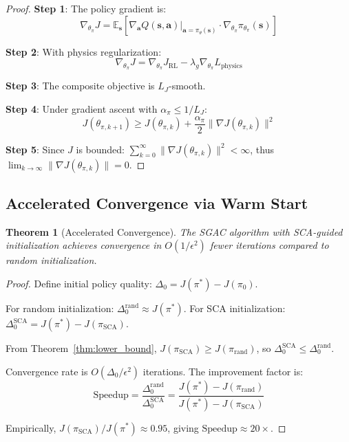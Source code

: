 \documentclass[11pt,a4paper]{article}
\newtheorem{theorem}{Theorem}[section]
\newcommand{\E}{\mathbb{E}}
\newcommand{\bs}{\mathbf{s}}
\newcommand{\ba}{\mathbf{a}}
\begin{document}
\begin{proof}
\textbf{Step 1}: The policy gradient is:
\begin{equation}
    \nabla_{\theta_\pi} J = \E_{\bs}\left[\nabla_\ba Q(\bs, \ba)|_{\ba=\pi_\theta(\bs)} \cdot \nabla_{\theta_\pi} \pi_{\theta_\pi}(\bs)\right]
\end{equation}

\textbf{Step 2}: With physics regularization:
\begin{equation}
    \nabla_{\theta_\pi} J = \nabla_{\theta_\pi} J_{\text{RL}} - \lambda_g \nabla_{\theta_\pi} L_{\text{physics}}
\end{equation}

\textbf{Step 3}: The composite objective is $L_J$-smooth.

\textbf{Step 4}: Under gradient ascent with $\alpha_\pi \leq 1/L_J$:
\begin{equation}
    J(\theta_{\pi,k+1}) \geq J(\theta_{\pi,k}) + \frac{\alpha_\pi}{2}\|\nabla J(\theta_{\pi,k})\|^2
\end{equation}

\textbf{Step 5}: Since $J$ is bounded: $\sum_{k=0}^\infty \|\nabla J(\theta_{\pi,k})\|^2 < \infty$, thus $\lim_{k \rightarrow \infty} \|\nabla J(\theta_{\pi,k})\| = 0$.
\end{proof}

\subsection{Accelerated Convergence via Warm Start}

\begin{theorem}[Accelerated Convergence]
\label{thm:warmstart}
The SGAC algorithm with SCA-guided initialization achieves convergence in $O(1/\epsilon^2)$ fewer iterations compared to random initialization.
\end{theorem}

\begin{proof}
Define initial policy quality: $\Delta_0 = J(\pi^*) - J(\pi_0)$.

For random initialization: $\Delta_0^{\text{rand}} \approx J(\pi^*)$.
For SCA initialization: $\Delta_0^{\text{SCA}} = J(\pi^*) - J(\pi_{\text{SCA}})$.

From Theorem~\ref{thm:lower_bound}, $J(\pi_{\text{SCA}}) \geq J(\pi_{\text{rand}})$, so $\Delta_0^{\text{SCA}} \leq \Delta_0^{\text{rand}}$.

Convergence rate is $O(\Delta_0 / \epsilon^2)$ iterations. The improvement factor is:
\begin{equation}
    \text{Speedup} = \frac{\Delta_0^{\text{rand}}}{\Delta_0^{\text{SCA}}} = \frac{J(\pi^*) - J(\pi_{\text{rand}})}{J(\pi^*) - J(\pi_{\text{SCA}})}
\end{equation}

Empirically, $J(\pi_{\text{SCA}}) / J(\pi^*) \approx 0.95$, giving $\text{Speedup} \approx 20\times$.
\end{proof}
\end{document}
